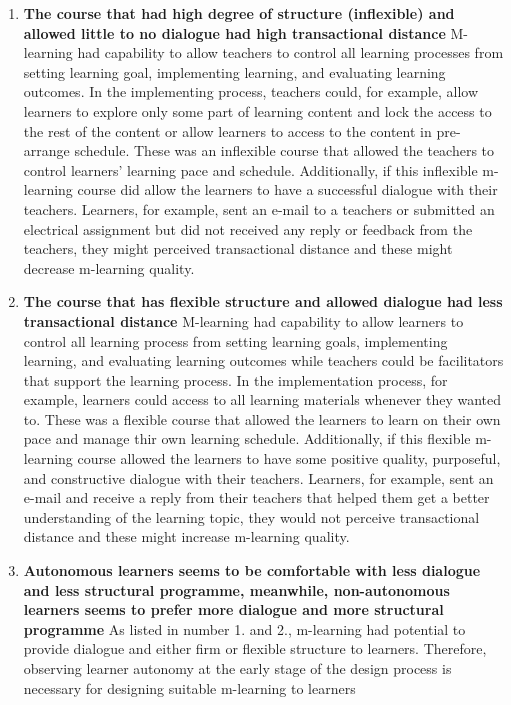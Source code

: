 \begin{enumerate} 
\item \textbf{The course that had high degree of structure (inflexible) and allowed little to no dialogue had high transactional distance}
\newline M-learning had capability to allow teachers to control all learning processes from setting learning goal, implementing learning, and evaluating learning outcomes. In the implementing process, teachers could, for example, allow learners to explore only some part of learning content and lock the access to the rest of the content or allow learners to access to the content in pre-arrange schedule. These was an inflexible course that allowed the teachers to control learners' learning pace and schedule. Additionally, if this inflexible m-learning course did allow the learners to have a successful dialogue with their teachers. Learners, for example, sent an e-mail to a teachers or submitted an electrical assignment but did not received any reply or feedback from the teachers, they might perceived transactional distance and these might decrease m-learning quality. 

\item \textbf{The course that has flexible structure and allowed dialogue had less transactional distance} 
\newline M-learning had capability to allow learners to control all learning process from setting learning goals, implementing learning, and evaluating learning outcomes while teachers could be facilitators that support the learning process. In the implementation process, for example, learners could access to all learning materials whenever they wanted to. These was a flexible course that allowed the learners to learn on their own pace and manage thir own learning schedule. Additionally, if this flexible m-learning course allowed the learners to have some positive quality, purposeful, and constructive dialogue with their teachers. Learners, for example, sent an e-mail and receive a reply from their teachers that helped them get a better understanding of the learning topic, they would not perceive transactional distance and these might increase m-learning quality. 

\item \textbf{Autonomous learners seems to be comfortable with less dialogue and less structural programme, meanwhile, non-autonomous learners seems to prefer more dialogue and more structural programme}
\newline As listed in number 1. and 2., m-learning had potential to provide dialogue and either firm or flexible structure to learners. Therefore, observing learner autonomy at the early stage of the design process is necessary for designing suitable m-learning to learners

\end{enumerate} 


